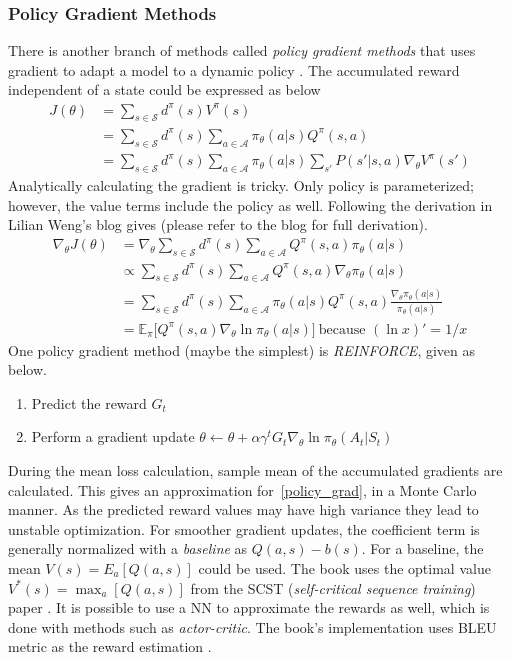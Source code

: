 \documentclass{article}
\begin{document}
\subsubsection{Policy Gradient Methods}
There is another branch of methods called \textit{policy gradient methods} that uses gradient to adapt a model to a dynamic policy \cite{lapan_deep_2020}. The accumulated reward independent of a state could be expressed as below
\begin{align}
    J(\theta)
&= \sum_{s \in \mathcal{S}} d^\pi(s) V^\pi(s) \\
&= \sum_{s \in \mathcal{S}} d^\pi(s) \sum_{a \in \mathcal{A}} \pi_\theta(a \vert s) Q^\pi(s, a)\\
&= \sum_{s \in \mathcal{S}} d^\pi(s)\sum_{a \in \mathcal{A}} \pi_\theta(a \vert s) \sum_{s'} P(s' \vert s,a) \nabla_\theta V^\pi(s')
\end{align}
Analytically calculating the gradient is tricky. Only policy is parameterized; however, the value terms include the policy as well. Following the derivation in Lilian Weng's blog gives (please refer to the blog for full derivation).
\begin{align}
\nabla_\theta J(\theta)
&= \nabla_\theta \sum_{s \in \mathcal{S}} d^\pi(s) \sum_{a \in \mathcal{A}} Q^\pi(s, a) \pi_\theta(a \vert s) \\
&\propto \sum_{s \in \mathcal{S}} d^\pi(s) \sum_{a \in \mathcal{A}} Q^\pi(s, a) \nabla_\theta \pi_\theta(a \vert s) \\
&= \sum_{s \in \mathcal{S}} d^\pi(s) \sum_{a \in \mathcal{A}} \pi_\theta(a \vert s) Q^\pi(s, a) \frac{\nabla_\theta \pi_\theta(a \vert s)}{\pi_\theta(a \vert s)} \\
&= \mathbb{E}_\pi \big[Q^\pi(s, a) \nabla_\theta \ln \pi_\theta(a \vert s)\big]\ \scriptstyle{\text{because } (\ln x)' = 1/x} \label{policy_grad}
\end{align}
One policy gradient method (maybe the simplest) is \textit{REINFORCE}, given as below.
\begin{enumerate}
    \item Predict the reward $G_t$
    \item Perform a gradient update $\theta \leftarrow \theta + \alpha \gamma^t G_t \nabla_\theta \ln \pi_\theta(A_t \vert S_t)$\ \cite{weng_policy_2018}
\end{enumerate}
During the mean loss calculation, sample mean of the accumulated gradients are calculated. This gives an approximation for~\ref{policy_grad}, in a Monte Carlo manner. As the predicted reward values may have high variance they lead to unstable optimization. For smoother gradient updates, the coefficient term is generally normalized with a \textit{baseline} as $Q(a,s)-b(s)$. For a baseline, the mean $V(s) = E_a[Q(a,s)]$ could be used. The book uses the optimal value $V^*(s) = \max_a[Q(a,s)]$ from the SCST (\textit{self-critical sequence training}) paper \cite{lapan_deep_2020, rennie_self-critical_2017}. It is possible to use a NN to approximate the rewards as well, which is done with methods such as \textit{actor-critic}. The book's implementation uses BLEU metric as the reward estimation \cite{lapan_deep_2020}.
\end{document}
